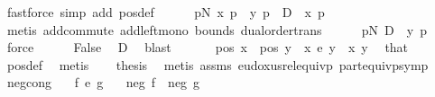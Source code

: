 \begin{isabellebody}
\ {\isacharparenleft}{\kern0pt}fastforce\ simp\ add{\isacharcolon}{\kern0pt}\ pos{\isacharunderscore}{\kern0pt}def{\isacharparenright}{\kern0pt}\isanewline
\ \ \ \ \isamarkupfalse%
\ {\isachardoublequoteopen}{\isasymforall}p{\isasymge}N{\isachardot}{\kern0pt}\ {\isasymbar}x\ p\ {\isacharminus}{\kern0pt}\ y\ p{\isasymbar}\ {\isacharplus}{\kern0pt}\ D\ {\isasymle}\ x\ p{\isachardoublequoteclose}\ \isamarkupfalse%
\ {\isacharparenleft}{\kern0pt}metis\ add{\isachardot}{\kern0pt}commute\ add{\isacharunderscore}{\kern0pt}left{\isacharunderscore}{\kern0pt}mono\ bounds{\isacharparenleft}{\kern0pt}{}{\isacharparenright}{\kern0pt}\ dual{\isacharunderscore}{\kern0pt}order{\isachardot}{\kern0pt}trans{\isacharparenright}{\kern0pt}\isanewline
\ \ \ \ \isamarkupfalse%
\ {\isachardoublequoteopen}{\isasymforall}p{\isasymge}N{\isachardot}{\kern0pt}\ D\ {\isasymle}\ y\ p{\isachardoublequoteclose}\ \isamarkupfalse%
\ force\isanewline
\ \ \ \ \isamarkupfalse%
\ False\ \isamarkupfalse%
\ D\ \isamarkupfalse%
\ blast\isanewline
\ \ \isacommand{{\isacharbraceright}{\kern0pt}}\isamarkupfalse%
\isanewline
\ \ \isamarkupfalse%
\ {\isachardoublequoteopen}pos\ x\ {\isasymLongrightarrow}\ pos\ y{\isachardoublequoteclose}\ \ {\isachardoublequoteopen}x\ {\isasymsim}\isactrlsub e\ y{\isachardoublequoteclose}\ \ x\ y\ \isamarkupfalse%
\ that\ \isamarkupfalse%
\ pos{\isacharunderscore}{\kern0pt}def\ \isamarkupfalse%
\ metis\isanewline
\ \ \isamarkupfalse%
\ {\isacharquery}{\kern0pt}thesis\ \isamarkupfalse%
\ {\isacharparenleft}{\kern0pt}metis\ assms\ eudoxus{\isacharunderscore}{\kern0pt}rel{\isacharunderscore}{\kern0pt}equivp\ part{\isacharunderscore}{\kern0pt}equivp{\isacharunderscore}{\kern0pt}symp{\isacharparenright}{\kern0pt}\isanewline
{}\isamarkupfalse%
%
\endisatagproof
{\isafoldproof}%
%
\isadelimproof
\isanewline
%
\endisadelimproof
\isanewline
{}\isamarkupfalse%
\ neg{\isacharunderscore}{\kern0pt}cong{\isacharcolon}{\kern0pt}\isanewline
\ \ \ {\isachardoublequoteopen}f\ {\isasymsim}\isactrlsub e\ g{\isachardoublequoteclose}\isanewline
\ \ \ {\isachardoublequoteopen}neg\ f\ {\isacharequal}{\kern0pt}\ neg\ g{\isachardoublequoteclose}\isanewline
%
\isadelimproof
%
\endisadelimproof
%
\isatagproof
{}\isamarkupfalse%
\ {\isacharminus}{\kern0pt}\isanewline

\end{isabellebody}
